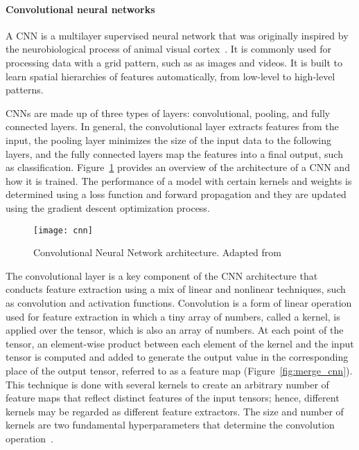 \paragraph{Convolutional neural networks} 

A \gls{CNN} is a multilayer supervised neural network that was originally inspired by the neurobiological process of animal visual cortex~\cite{Ganatra2018ATools}. It is commonly used for processing data with a grid pattern, such as as images and videos. It is built to learn spatial hierarchies of features automatically, from low-level to high-level patterns. 

\gls{CNN}s are made up of three types of layers: convolutional, pooling, and fully connected layers. In general, the convolutional layer extracts features from the input, the pooling layer minimizes the size of the input data to the following layers, and the fully connected layers map the features into a final output, such as classification. Figure~\ref{fig:cnn} provides an overview of the architecture of a \gls{CNN} and how it is trained. The performance of a model with certain kernels and weights is determined using a loss function and forward propagation and they are updated using the gradient descent optimization process.

\begin{figure}[htbp]
    \centering
    \texttt{[image: cnn]}
    \caption{Convolutional Neural Network architecture. Adapted from~\cite{Yamashita2018ConvolutionalRadiology}}
    \label{fig:cnn}
\end{figure}

The convolutional layer is a key component of the \gls{CNN} architecture that conducts feature extraction using a mix of linear and nonlinear techniques, such as convolution and activation functions. Convolution is a form of linear operation used for feature extraction in which a tiny array of numbers, called a kernel, is applied over the tensor, which is also an array of numbers. At each point of the tensor, an element-wise product between each element of the kernel and the input tensor is computed and added to generate the output value in the corresponding place of the output tensor, referred to as a feature map (Figure~\ref{fig:merge_cnn}). This technique is done with several kernels to create an arbitrary number of feature maps that reflect distinct features of the input tensors; hence, different kernels may be regarded as different feature extractors. The size and number of kernels are two fundamental hyperparameters that determine the convolution operation~\cite{Yamashita2018ConvolutionalRadiology}.

